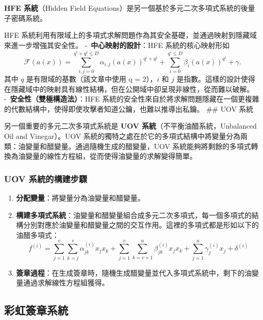 \documentclass[
]{article}
\begin{document}
\textbf{HFE 系統}（Hidden Field
Equations）是另一個基於多元二次多項式系統的後量子密碼系統。

HFE
系統利用有限域上的多項式求解問題作為其安全基礎，並通過映射到隱藏域來進一步增強其安全性。
-~\textbf{中心映射的設計}：HFE 系統的核心映射形如 \[
\mathcal{F}(a(x))
= \sum_{i,j=0}^{q^{i}+q^{j}\leq D}  \alpha_{i,j}(a(x))^{q^{i}+q^{j}}
+ \sum_{i=0}^{q^{i}\leq D} \beta_{i}(a(x))^{q^{i}} +\gamma.
\] 其中 \(q\) 是有限域的基數（該文章中使用 q = 2），\(i\) 和 \(j\)
是指數。這樣的設計使得在隱藏域中的映射具有線性結構，但在公開域中卻呈現非線性，從而難以破解。~
-~\textbf{安全性（雙極構造法）}：HFE
系統的安全性來自於將求解問題隱藏在一個更複雜的代數結構中，使得即使攻擊者知道公鑰，也難以推導出私鑰。
\#\# UOV 系統

另一個重要的多元二次多項式系統是 \textbf{UOV
系統}（不平衡油醋系統，Unbalanced Oil and Vinegar）。UOV
系統的獨特之處在於它的多項式結構中將變量分為兩類：油變量和醋變量。通過隨機生成的醋變量，UOV
系統能夠將剩餘的多項式轉換為油變量的線性方程組，從而使得油變量的求解變得簡單。

\hypertarget{uov-ux7cfbux7d71ux7684ux69cbux5efaux6b65ux9a5f}{%
\subsubsection{UOV
系統的構建步驟}\label{uov-ux7cfbux7d71ux7684ux69cbux5efaux6b65ux9a5f}}

\begin{enumerate}
\def\labelenumi{\arabic{enumi}.}
\item
  \textbf{分配變量}：將變量分為油變量和醋變量。
\item
  \textbf{構建多項式系統}：油變量和醋變量組合成多元二次多項式，每一個多項式的結構分別對應於油變量和醋變量之間的交互作用。這裡的多項式都是形如以下的油醋多項式：
  \[
  f^{(i)}
  =
  \sum_{j=1}^{v} \sum_{k=j}^{v}\alpha_{jk}^{(i)} x_{j}x_{k} +
  \sum_{j=1}^{v} \sum_{k=v+1}^{n}\beta_{jk}^{(i)} x_{j}x_{k} +
  \sum_{j=1}^{n} \gamma_{j}^{(i)} x_{j} +\delta^{(i)}
  \]
\item
  \textbf{簽章過程}：在生成簽章時，隨機生成醋變量並代入多項式系統中，剩下的油變量通過求解線性方程組獲得。
\end{enumerate}

\hypertarget{ux5f69ux8679ux7c3dux7ae0ux7cfbux7d71}{%
\subsection{彩虹簽章系統}\label{ux5f69ux8679ux7c3dux7ae0ux7cfbux7d71}}
\end{document}
